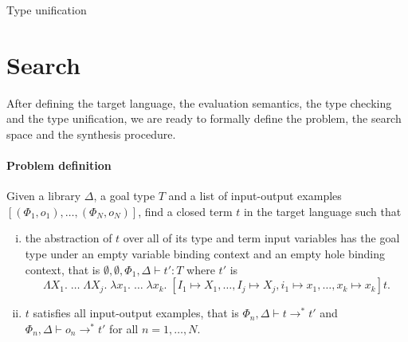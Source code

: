 \begin{algorithm}
\caption{Type unification\label{alg:type unification}}

\end{algorithm} 

\section{Search}
After defining the target language, the evaluation semantics, the type checking and the type unification, we are ready to formally define the problem, the search space and the synthesis procedure.

\paragraph{Problem definition} Given a library $\Delta$, a goal type $T$ and a list of input-output examples $[(\Phi_1, o_1), \ldots , (\Phi_N, o_N)]$, find a closed term $t$ in the target language such that
\begin{enumerate}[(i)]
\item the abstraction of $t$ over all of its type and term input variables has the goal type under an empty variable binding context and an empty hole binding context, that is $\emptyset, \emptyset, \Phi_1, \Delta \vdash t' : T$ where $t'$ is \[\Lambda X_1.\; \ldots\; \Lambda X_j.\; \lambda x_1.\; \ldots\; \lambda x_k.\; [I_1 \mapsto X_1, \ldots, I_j \mapsto X_j, i_1 \mapsto x_1, \ldots, x_k \mapsto x_k]t.\]
\item $t$ satisfies all input-output examples, that is $\Phi_n, \Delta \vdash t \longrightarrow^* t'$ and $\Phi_n, \Delta \vdash o_n \longrightarrow^* t'$ for all $n = 1, \ldots, N$.
\end{enumerate}

